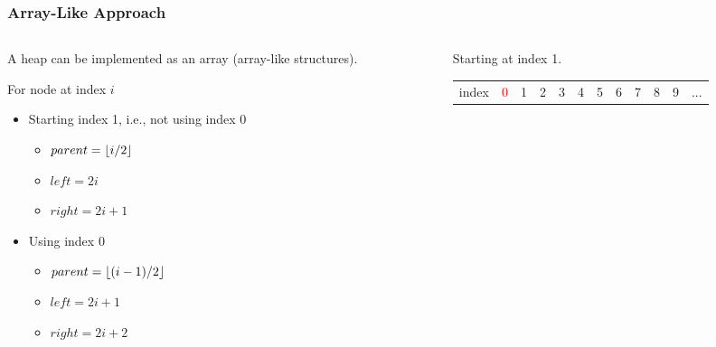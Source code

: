 \documentclass[10pt]{beamer}
\DeclarePairedDelimiter\floor{\lfloor}{\rfloor}
\begin{document}
\begin{frame}[t]\frametitle{Array-Like Approach}

	\begin{columns}[T] %
	\begin{column}{.5\linewidth} %
	{\footnotesize
	    	A heap can be implemented as an array (array-like structures).
		
		For node at index \(i\)
			
		\begin{itemize}
			\item
			Starting index 1, 
			i.e., not using index 0
			\begin{itemize}
				\item
				 \( parent = \floor*{i / 2} \)
				
				\item
				\( left = 2 i \)
				
				\item
				\( right = 2 i + 1 \)
			\end{itemize}
			
			\item
			Using index 0
			\begin{itemize}
				\item
				 \( parent = \floor*{ (i - 1) / 2} \)
				
				\item
				\( left = 2 i + 1 \)
				
				\item
				\( right = 2 i + 2 \)
			\end{itemize}
		\end{itemize}
	} %
	\end{column} %
	\begin{column}{.5\linewidth} %
		\begin{example}
		{\footnotesize
		Starting at index 1.
		} %

		{\scriptsize
			
		} %

		{\tiny 
			\begin{table}[t]
			\setlength{\tabcolsep}{5pt}
			\begin{tabular}
				{|
					p{.3cm} 
					!{\vrule width 1pt}
					*{11}{p{.05cm}|} 
				}
				\hline
				\textcolor{colorIndex}{index}	
				&\textcolor{red}{0}
				&\textcolor{colorIndex}{1}	&\textcolor{colorIndex}{2}	
				&\textcolor{colorIndex}{3}	&\textcolor{colorIndex}{4}	
				&\textcolor{colorIndex}{5}	&\textcolor{colorIndex}{6}	
				&\textcolor{colorIndex}{7}	&\textcolor{colorIndex}{8}	
				&\textcolor{colorIndex}{9}	&\textcolor{colorIndex}{...}\\
				

\end{tabular}
\end{table}}
\end{example}
\end{column}
\end{columns}
\end{frame}
\end{document}
